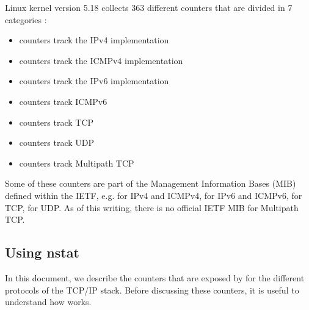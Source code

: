 \documentclass[letterpaper,10pt,english]{sphinxmanual}
\begin{document}
\sphinxAtStartPar
Linux kernel version 5.18 collects 363 different counters that are divided in 7 categories :
\begin{itemize}
\item {} 
 counters track the IPv4 implementation

\item {} 
 counters track the ICMPv4 implementation

\item {} 
 counters track the IPv6 implementation

\item {} 
 counters track ICMPv6

\item {} 
 counters track TCP

\item {} 
 counters track UDP

\item {} 
 counters track Multipath TCP

\end{itemize}

\sphinxAtStartPar
Some of these counters are part of the Management Information Bases (MIB) defined
within the IETF, e.g.  for IPv4 and ICMPv4,  for IPv6 and ICMPv6,   for TCP,  for UDP. As of this writing, there is no official IETF MIB for Multipath TCP.


\subsection{Using nstat}
\label{\detokenize{mptcp-linux:using-nstat}}
\sphinxAtStartPar
In this document, we describe the counters that are exposed by
for the different protocols of the TCP/IP stack. Before discussing
these counters, it is useful to understand how
 works.
\end{document}
